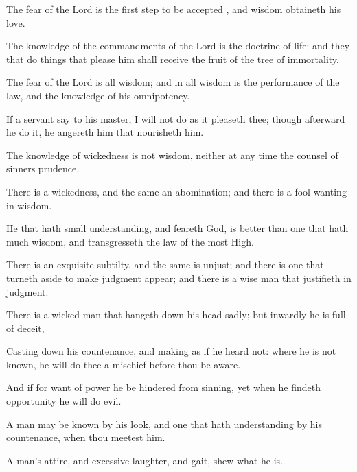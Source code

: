 {\par }{\PP {}The fear of the Lord is the first step to be accepted
{}, and wisdom obtaineth his love.
\par }{\PP {}The knowledge of the commandments of the Lord is the doctrine of life: and they that do things that please him shall receive the fruit of the tree of immortality.
\par }{\PP {}The fear of the Lord is all wisdom; and in all wisdom is the performance of the law, and the knowledge of his omnipotency.
\par }{\PP {}If a servant say to his master, I will not do as it pleaseth thee; though afterward he do it, he angereth him that nourisheth him.
\par }{\PP {}The knowledge of wickedness is not wisdom, neither at any time the counsel of sinners prudence.
\par }{\PP {}There is a wickedness, and the same an abomination; and there is a fool wanting in wisdom.
\par }{\PP {}He that hath small understanding, and feareth God, is better than one that hath much wisdom, and transgresseth the law of the most High.
\par }{\PP {}There is an exquisite subtilty, and the same is unjust; and there is one that turneth aside to make judgment appear; and there is a wise man that justifieth in judgment.
\par }{\PP {}There is a wicked man that hangeth down his head sadly; but inwardly he is full of deceit,
\par }{\PP {}Casting down his countenance, and making as if he heard not: where he is not known, he will do thee a mischief before thou be aware.
\par }{\PP {}And if for want of power he be hindered from sinning, yet when he findeth opportunity he will do evil.
\par }{\PP {}A man may be known by his look, and one that hath understanding by his countenance, when thou meetest him.
\par }{\PP {}A man’s attire, and excessive laughter, and gait, shew what he is.

}
